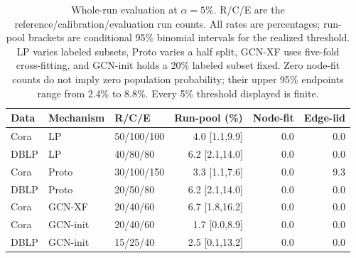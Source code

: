 \begin{table}[htbp]
\centering\small
\setlength{\tabcolsep}{4pt}
\begin{tabular}{lllrrr}
\toprule
Data & Mechanism & R/C/E & Run-pool (\%) & Node-fit & Edge-iid \\
\midrule
Cora & LP & 50/100/100 & 4.0 [1.1,9.9] & 0.0 & 0.0 \\
DBLP & LP & 40/80/80 & 6.2 [2.1,14.0] & 0.0 & 0.0 \\
Cora & Proto & 30/100/150 & 3.3 [1.1,7.6] & 0.0 & 9.3 \\
DBLP & Proto & 20/50/80 & 6.2 [2.1,14.0] & 0.0 & 0.0 \\
Cora & GCN-XF & 20/40/60 & 6.7 [1.8,16.2] & 0.0 & 0.0 \\
Cora & GCN-init & 20/40/60 & 1.7 [0.0,8.9] & 0.0 & 0.0 \\
DBLP & GCN-init & 15/25/40 & 2.5 [0.1,13.2] & 0.0 & 0.0 \\
\bottomrule
\end{tabular}
\caption{Whole-run evaluation at $\alpha=5\%$. R/C/E are the reference/calibration/evaluation run counts. All rates are percentages; run-pool brackets are conditional 95\% binomial intervals for the realized threshold. LP varies labeled subsets, Proto varies a half split, GCN-XF uses five-fold cross-fitting, and GCN-init holds a 20\% labeled subset fixed. Zero node-fit counts do not imply zero population probability; their upper 95\% endpoints range from 2.4\% to 8.8\%. Every 5\% threshold displayed is finite.}
\label{tab:run-calibration}
\end{table}
